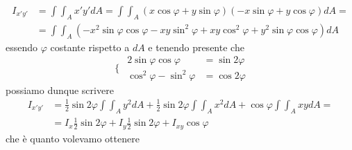 \begin{align*}
I_{x'y'} &= \int\int_A x'y'dA = \int\int_A (x\cos\varphi+y\sin\varphi)(-x\sin\varphi+y\cos\varphi)dA = \\
           &= \int\int_A (-x^{2}\sin\varphi\cos\varphi-xy\sin^{2}\varphi+xy\cos^{2}\varphi+y^{2}\sin\varphi\cos\varphi)dA
\end{align*}
essendo $\varphi$ costante rispetto a $dA$ e tenendo presente che
\begin{equation*}
\,\,\biggl\{\,\
\begin{aligned}
2\sin\varphi\cos\varphi &= \sin 2\varphi \\
\cos^{2}\varphi-\sin^{2}\varphi  &= \cos 2\varphi
\end{aligned}
\end{equation*}
possiamo dunque scrivere
\begin{align*}
I_{x'y'} &= \frac{1}{2}\sin 2\varphi\int\int_A y^{2}dA + \frac{1}{2}\sin 2\varphi\int\int_A x^{2}dA +\cos\varphi\int\int_{A}xydA= \\
           &=  I_{x}\frac{1}{2}\sin 2\varphi + I_{y}\frac{1}{2}\sin 2\varphi +I_{xy}\cos\varphi
\end{align*}
che è quanto volevamo ottenere
